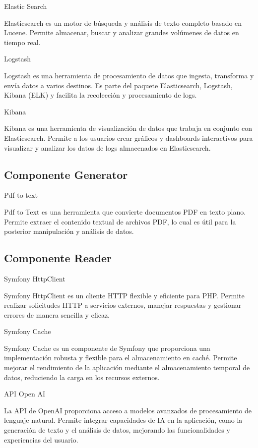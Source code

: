 Elastic Search

Elasticsearch es un motor de búsqueda y análisis de texto completo basado en Lucene.
Permite almacenar, buscar y analizar grandes volúmenes de datos en tiempo real.

Logstash

Logstash es una herramienta de procesamiento de datos que ingesta, transforma y envía datos a varios
destinos.
Es parte del paquete Elasticsearch, Logstash, Kibana (ELK) y facilita la recolección y procesamiento de logs.

Kibana

Kibana es una herramienta de visualización de datos que trabaja en conjunto con Elasticsearch.
Permite a los usuarios crear gráficos y dashboards interactivos para visualizar y analizar los datos de logs almacenados
en Elasticsearch.

\subsection*{Componente Generator}

Pdf to text

Pdf to Text es una herramienta que convierte documentos PDF en texto plano.
Permite extraer el contenido textual de archivos PDF, lo cual es útil para la posterior manipulación y análisis de
datos.

\subsection*{Componente Reader}

Symfony HttpClient

Symfony HttpClient es un cliente HTTP flexible y eficiente para PHP. Permite realizar solicitudes HTTP a servicios
externos, manejar respuestas y gestionar errores de manera sencilla y eficaz.

Symfony Cache

Symfony Cache es un componente de Symfony que proporciona una implementación robusta y flexible para el almacenamiento
en caché.
Permite mejorar el rendimiento de la aplicación mediante el almacenamiento temporal de datos, reduciendo la carga en los
recursos externos.

API Open AI

La API de OpenAI proporciona acceso a modelos avanzados de procesamiento de lenguaje natural.
Permite integrar capacidades de IA en la aplicación, como la generación de texto y el análisis de datos, mejorando las
funcionalidades y experiencias del usuario.


